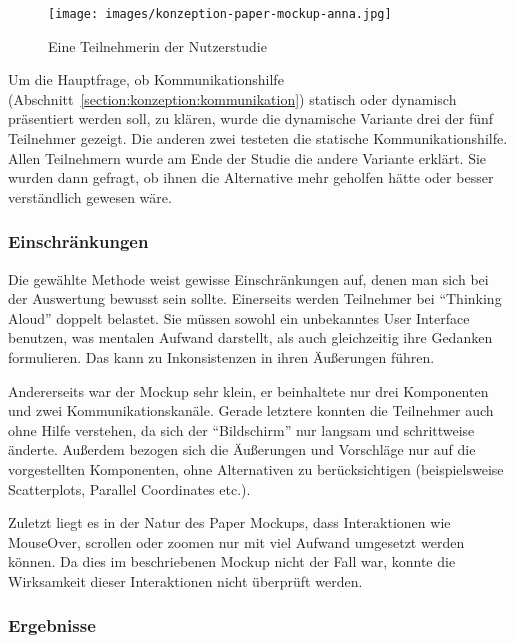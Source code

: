 \documentclass[
	headsepline,
	footsepline,
	fontsize=12pt,
	bibliography=totoc
]{scrbook}
\begin{document}
\begin{figure}[htbp]
   \centering
   \texttt{[image: images/konzeption-paper-mockup-anna.jpg]}
   \caption{Eine Teilnehmerin der Nutzerstudie}
   \label{figure:paper-mockup-anna}
\end{figure}

Um die Hauptfrage, ob Kommunikationshilfe (Abschnitt~\ref{section:konzeption:kommunikation}) statisch oder dynamisch präsentiert werden soll, zu klären, wurde die dynamische Variante drei der fünf Teilnehmer gezeigt. Die anderen zwei testeten die statische Kommunikationshilfe. Allen Teilnehmern wurde am Ende der Studie die andere Variante erklärt. Sie wurden dann gefragt, ob ihnen die Alternative mehr geholfen hätte oder besser verständlich gewesen wäre.

\subsubsection{Einschränkungen}


Die gewählte Methode weist gewisse Einschränkungen auf, denen man sich bei der Auswertung bewusst sein sollte. Einerseits werden Teilnehmer bei \enquote{Thinking Aloud} doppelt belastet. Sie müssen sowohl ein unbekanntes User Interface benutzen, was mentalen Aufwand darstellt, als auch gleichzeitig ihre Gedanken formulieren. Das kann zu Inkonsistenzen in ihren Äußerungen führen.

Andererseits war der Mockup sehr klein, er beinhaltete nur drei Komponenten und zwei Kommunikationskanäle. Gerade letztere konnten die Teilnehmer auch ohne Hilfe verstehen, da sich der \enquote{Bildschirm} nur langsam und schrittweise änderte. Außerdem bezogen sich die Äußerungen und Vorschläge nur auf die vorgestellten Komponenten, ohne Alternativen zu berücksichtigen (beispielsweise Scatterplots, Parallel Coordinates etc.).

Zuletzt liegt es in der Natur des Paper Mockups, dass Interaktionen wie MouseOver, scrollen oder zoomen nur mit viel Aufwand umgesetzt werden können. Da dies im beschriebenen Mockup nicht der Fall war, konnte die Wirksamkeit dieser Interaktionen nicht überprüft werden.

\subsubsection{Ergebnisse}
\end{document}
